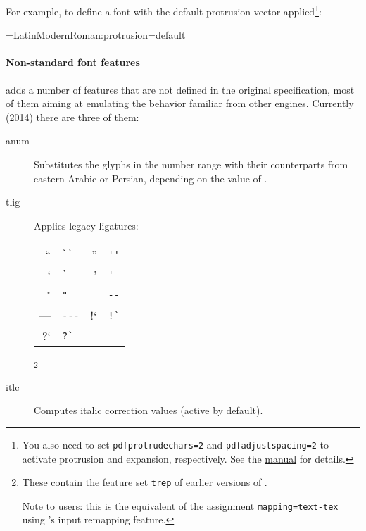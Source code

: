 \begin{description}
       For example, to define a font with the default
       protrusion vector applied\footnote{%
         You also need to set
             \verb|pdfprotrudechars=2| and
             \verb|pdfadjustspacing=2|
         to activate protrusion and expansion, respectively.
         See the
         \href{http://mirrors.ctan.org/systems/pdftex/manual/pdftex-a.pdf}%
              {\PDFTEX manual}
         for details.
       }:

			 \beginlisting
 \font\test=LatinModernRoman:protrusion=default
 			 \endlisting
\end{description}

\paragraph{Non-standard font features}
 adds a number of features that are not defined
in the original \OpenType specification, most of them
aiming at emulating the behavior familiar from other \TEX engines.
%
Currently (2014) there are three of them:

\begin{description}

  \item [anum]
          Substitutes the glyphs in the  number range
          with their counterparts from eastern Arabic or Persian,
          depending on the value of .

  \item [tlig]
          Applies legacy \TEX ligatures:

          \begin{tabular}{rlrl}
             ``  &  \verb|``|  &  ''  &  \verb|''|  \\
             `   &  \verb|`|   &  '   &  \verb|'|   \\
             "   &  \verb|"|   &  --  &  \verb|--|  \\
             --- &  \verb|---| &  !`  &  \verb|!`|  \\
             ?`  &  \verb|?`|  &      &             \\
          \end{tabular}

          \footnote{%
            These contain the feature set \verb|trep| of earlier
            versions of .

            Note to \XETEX users: this is the equivalent of the
            assignment \verb|mapping=text-tex| using \XETEX's input
            remapping feature.
          }

  \item [itlc]
          Computes italic correction values (active by default).

\end{description}


